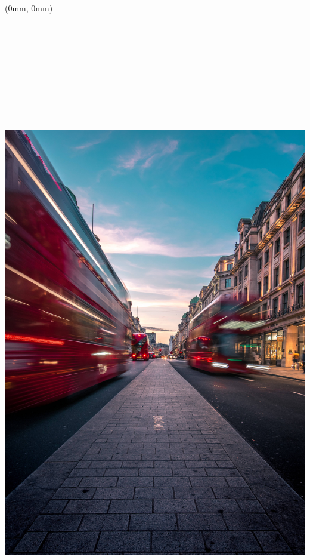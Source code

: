 \documentclass[
  a4paper,
  twoside, 11pt]{article}
\author{}
\date{\vspace{-2.5em}}
\begin{document}
\frenchspacing

\raggedright

\raggedbottom

\begin{textblock*}{21cm}(0mm, 0mm)
\includegraphics[width=21cm,height=29.7cm]{../2021_q4/cover_image_2021_q4.jpg}
\end{textblock*}
\end{document}
